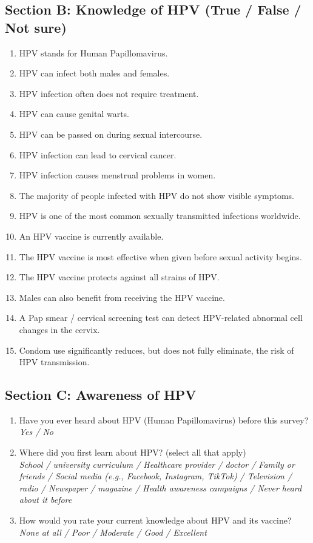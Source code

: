 \subsection*{Section B: Knowledge of HPV (True / False / Not sure)}
\begin{enumerate}[leftmargin=*,itemsep=3pt]
\item HPV stands for Human Papillomavirus.
\item HPV can infect both males and females.
\item HPV infection often does not require treatment.
\item HPV can cause genital warts.
\item HPV can be passed on during sexual intercourse.
\item HPV infection can lead to cervical cancer.
\item HPV infection causes menstrual problems in women.
\item The majority of people infected with HPV do not show visible symptoms.
\item HPV is one of the most common sexually transmitted infections worldwide.
\item An HPV vaccine is currently available.
\item The HPV vaccine is most effective when given before sexual activity begins.
\item The HPV vaccine protects against all strains of HPV.
\item Males can also benefit from receiving the HPV vaccine.
\item A Pap smear / cervical screening test can detect HPV-related abnormal cell changes in the cervix.
\item Condom use significantly reduces, but does not fully eliminate, the risk of HPV transmission.
\end{enumerate}
\subsection*{Section C: Awareness of HPV}
\begin{enumerate}[leftmargin=*,itemsep=3pt]
\item Have you ever heard about HPV (Human Papillomavirus) before this survey?\\\hspace*{1em}\textit{Yes / No}
\item Where did you first learn about HPV? (select all that apply)\\\hspace*{1em}\textit{School / university curriculum / Healthcare provider / doctor / Family or friends / Social media (e.g., Facebook, Instagram, TikTok) / Television / radio / Newspaper / magazine / Health awareness campaigns / Never heard about it before}
\item How would you rate your current knowledge about HPV and its vaccine?\\\hspace*{1em}\textit{None at all / Poor / Moderate / Good / Excellent}
\end{enumerate}
